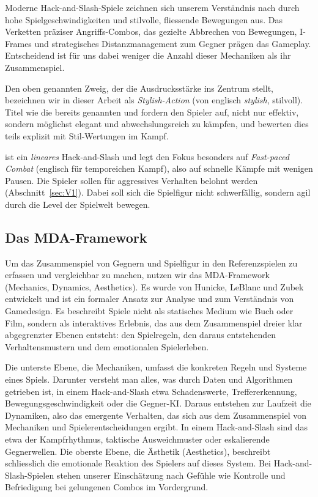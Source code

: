 \documentclass[../Main.tex]{subfiles}
\begin{document}
Moderne Hack-and-Slash-Spiele zeichnen sich unserem Verständnis nach durch hohe Spielgeschwindigkeiten und stilvolle, fliessende Bewegungen aus. Das Verketten präziser Angriffs-Combos, das gezielte Abbrechen von Bewegungen, I-Frames und strategisches Distanzmanagement zum Gegner prägen das Gameplay. Entscheidend ist für uns dabei weniger die Anzahl dieser Mechaniken als ihr Zusammenspiel.

Den oben genannten Zweig, der die Ausdrucksstärke ins Zentrum stellt, bezeichnen wir in dieser Arbeit als \textit{Stylish-Action} (von englisch \textit{stylish}, stilvoll). Titel wie die bereits genannten  und  fordern den Spieler auf, nicht nur effektiv, sondern möglichst elegant und abwechslungsreich zu kämpfen, und bewerten dies teils explizit mit Stil-Wertungen im Kampf.\autocite{capcom_devilmaycry_2001,platinumgames_bayonetta_2009}

 ist ein \textit{lineares} Hack-and-Slash und legt den Fokus besonders auf \textit{Fast-paced Combat} (englisch für temporeichen Kampf), also auf schnelle Kämpfe mit wenigen Pausen. Die Spieler sollen für aggressives Verhalten belohnt werden (Abschnitt~\ref{sec:V1}). Dabei soll sich die Spielfigur nicht schwerfällig, sondern agil durch die Level der Spielwelt bewegen.

\subsection{Das MDA-Framework} \label{sec:MDA}
Um das Zusammenspiel von Gegnern und Spielfigur in den Referenzspielen zu erfassen und vergleichbar zu machen, nutzen wir das MDA-Framework (Mechanics, Dynamics, Aesthetics). Es wurde von Hunicke, LeBlanc und Zubek entwickelt und ist ein formaler Ansatz zur Analyse und zum Verständnis von Gamedesign. Es beschreibt Spiele nicht als statisches Medium wie Buch oder Film, sondern als interaktives Erlebnis, das aus dem Zusammenspiel dreier klar abgegrenzter Ebenen entsteht: den Spielregeln, den daraus entstehenden Verhaltensmustern und dem emotionalen Spielerleben.\autocite[1--2]{hunicke2004mda}

Die unterste Ebene, die Mechaniken, umfasst die konkreten Regeln und Systeme eines Spiels. Darunter versteht man alles, was durch Daten und Algorithmen getrieben ist, in einem Hack-and-Slash etwa Schadenswerte, Treffererkennung, Bewegungsgeschwindigkeit oder die Gegner-KI. Daraus entstehen zur Laufzeit die Dynamiken, also das emergente Verhalten, das sich aus dem Zusammenspiel von Mechaniken und Spielerentscheidungen ergibt. In einem Hack-and-Slash sind das etwa der Kampfrhythmus, taktische Ausweichmuster oder eskalierende Gegnerwellen. Die oberste Ebene, die Ästhetik (Aesthetics), beschreibt schliesslich die emotionale Reaktion des Spielers auf dieses System.\autocite[2]{hunicke2004mda} Bei Hack-and-Slash-Spielen stehen unserer Einschätzung nach Gefühle wie Kontrolle und Befriedigung bei gelungenen Combos im Vordergrund.
\end{document}
